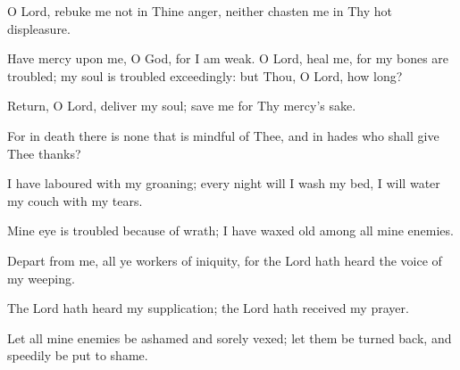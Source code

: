 O Lord, rebuke me not in Thine anger, neither chasten me in Thy hot displeasure.

Have mercy upon me, O God, for I am weak. O Lord, heal me, for my bones are troubled; my soul is troubled exceedingly: but Thou, O Lord, how long?

Return, O Lord, deliver my soul; save me for Thy mercy's sake.

For in death there is none that is mindful of Thee, and in hades who shall give Thee thanks?

I have laboured with my groaning; every night will I wash my bed, I will water my couch with my tears.

Mine eye is troubled because of wrath; I have waxed old among all mine enemies.

Depart from me, all ye workers of iniquity, for the Lord hath heard the voice of my weeping.

The Lord hath heard my supplication; the Lord hath received my prayer.

Let all mine enemies be ashamed and sorely vexed; let them be turned back, and speedily be put to shame.
